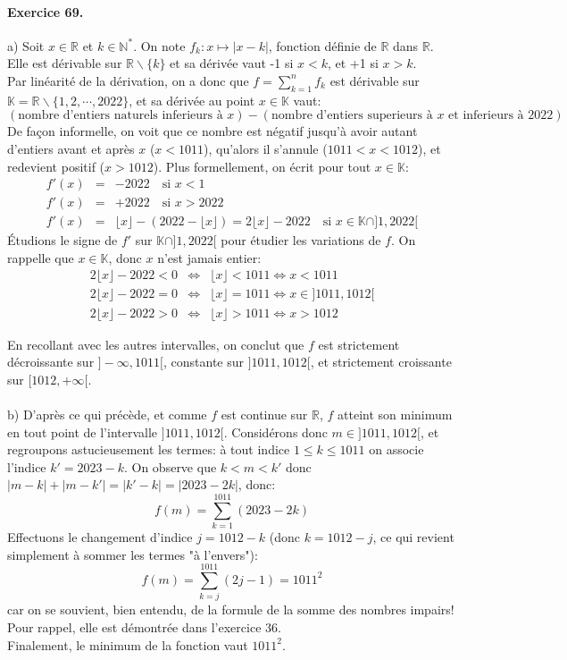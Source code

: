 \paragraph{Exercice 69.} a) Soit $x\in\mathbb{R}$ et $k\in\mathbb{N}^*$. On note $f_k:x\mapsto |x-k|$, fonction définie de $\mathbb{R}$ dans $\mathbb{R}$. \\
Elle est dérivable sur $\mathbb{R}\backslash{\{k\}}$ et sa dérivée vaut -1 si $x<k$, et +1 si $x>k$.\\
 Par linéarité de la dérivation, on a donc que $f=\sum_{k=1}^n{f_k}$ est dérivable sur $\mathbb{K}=\mathbb{R}\backslash\{1,2,\cdots,2022\}$,
 et sa dérivée au point $x\in\mathbb{K}$ vaut:
 \[
 (\textrm{nombre d'entiers naturels inferieurs à }x) - (\textrm{nombre d'entiers superieurs à } x \textrm{ et inferieurs à 2022})
 \]
 De façon informelle, on voit que ce nombre est négatif jusqu’à avoir autant d'entiers avant et après $x$ ($x<1011$), qu'alors il s'annule ($1011 < x < 1012$), et redevient positif ($x>1012$). Plus formellement, on écrit pour tout $x\in\mathbb{K}$:
\begin{eqnarray}
  f'(x) &=& -2022 \quad \textrm{si } x < 1 \nonumber \\
  f'(x) &=& +2022 \quad \textrm{si } x > 2022 \nonumber \\
  f'(x) &=& \lfloor x \rfloor - (2022-\lfloor x \rfloor)=2\lfloor x \rfloor -2022 \quad \textrm{si } x \in \mathbb{K}\cap ]1,2022[ \nonumber 
\end{eqnarray}
 Étudions le signe de $f'$ sur $\mathbb{K}\cap ]1,2022[$ pour étudier les variations de $f$. On rappelle que $x\in\mathbb{K}$, donc $x$ n'est jamais entier:
 \begin{eqnarray}
2\lfloor x \rfloor -2022 < 0 &\Leftrightarrow & \lfloor x \rfloor < 1011 \Leftrightarrow x < 1011 \nonumber \\
2\lfloor x \rfloor -2022 = 0 &\Leftrightarrow & \lfloor x \rfloor = 1011 \Leftrightarrow x \in ]1011, 1012[ \nonumber \\
2\lfloor x \rfloor -2022 > 0 &\Leftrightarrow & \lfloor x \rfloor > 1011 \Leftrightarrow x > 1012 \nonumber
 \end{eqnarray}

En recollant avec les autres intervalles, on conclut que $f$ est strictement décroissante sur $]-\infty, 1011[$, constante sur $]1011, 1012[$, et strictement croissante sur $[1012, +\infty[$. \\ \\
b) D’après ce qui précède, et comme $f$ est continue sur $\mathbb{R}$, $f$ atteint son minimum en tout point de l'intervalle $]1011,1012[$. Considérons donc $m\in]1011,1012[$, et regroupons astucieusement les termes: à tout indice $1 \leq k\leq 1011$ on associe l'indice $k'=2023-k$. On observe que $k<m<k'$ donc $|m-k|+|m-k'|=|k'-k|=|2023-2k|$, donc:
\[
f(m)=\sum_{k=1}^{1011}{(2023-2k)}
\]
Effectuons le changement d'indice $j=1012-k$ (donc $k=1012-j$, ce qui revient simplement à sommer les termes "à l'envers"):
\[
f(m)=\sum_{k=j}^{1011}{(2j-1)}=1011^2
\]
car on se souvient, bien entendu, de la formule de la somme des nombres impairs! Pour rappel, elle est démontrée dans l'exercice 36.\\
Finalement, le minimum de la fonction vaut $1011^2$.

